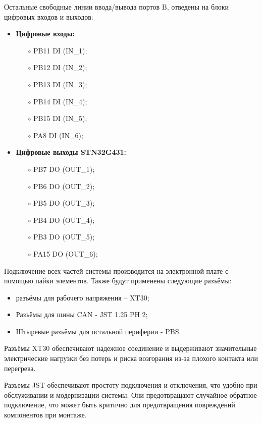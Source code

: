 Остальные свободные линии ввода/вывода портов B, отведены на блоки цифровых входов и выходов:
\begin{itemize}
    \item \textbf{Цифровые входы:}
    \begin{itemize}
        \item[$\circ$] PB11 \leftarrow DI (IN\_1);
        \item[$\circ$] PB12 \leftarrow DI (IN\_2);
        \item[$\circ$] PB13 \leftarrow DI (IN\_3);
        \item[$\circ$] PB14 \leftarrow DI (IN\_4);
        \item[$\circ$] PB15 \leftarrow DI (IN\_5);
        \item[$\circ$] PA8 \leftarrow DI (IN\_6);
    \end{itemize}
    \item \textbf{Цифровые выходы STN32G431:}
    \begin{itemize}
        \item[$\circ$] PB7 \rightarrow DO (OUT\_1);
        \item[$\circ$] PB6 \rightarrow DO (OUT\_2);
        \item[$\circ$] PB5 \rightarrow DO (OUT\_3);
        \item[$\circ$] PB4 \rightarrow DO (OUT\_4);
        \item[$\circ$] PB3 \rightarrow DO (OUT\_5);
        \item[$\circ$] PA15 \rightarrow DO (OUT\_6);
    \end{itemize}
\end{itemize}

Подключение всех частей системы производится на электронной плате с помощью пайки элементов. Также будут применены следующие разъёмы:
\begin{itemize}
    \item разъёмы для рабочего напряжения – XT30;
    \item Разъёмы для шины CAN - JST 1.25 PH 2;
    \item Штыревые разъёмы для остальной периферии - PBS.
\end{itemize}

Разъёмы XT30 обеспечивают надежное соединение и выдерживают значительные электрические нагрузки без потерь и риска возгорания из-за плохого контакта или перегрева.

Разъемы JST обеспечивают простоту подключения и отключения, что удобно при обслуживании и модернизации системы. Они предотвращают случайное обратное подключение, что может быть критично для предотвращения повреждений компонентов при монтаже.

